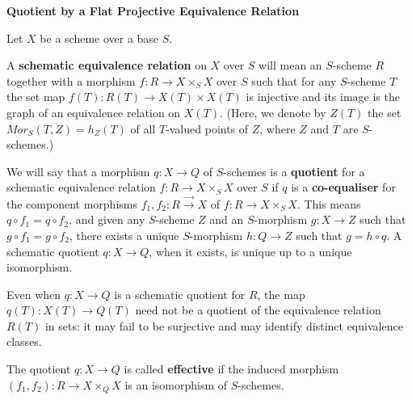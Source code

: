 \centerline{\large\bf Quotient by a Flat Projective Equivalence Relation}



\medskip


Let $X$ be a scheme over a base $S$.
\begin{definition}\label{nhq-schematic-equivalence-relation}
A \textbf{schematic equivalence relation} on $X$ over $S$ will
mean an $S$-scheme $R$ together with a morphism
$f: R \to X\times_SX$ over $S$ such that for any $S$-scheme
$T$ the set map $f(T) : R(T) \to X(T)\times X(T)$
is injective and its image is the graph of an equivalence relation on
$X(T)$. (Here, we denote by $Z(T)$ the set $Mor_S(T,Z)= h_Z(T)$ of
all $T$-valued points of $Z$, where $Z$ and $T$ are $S$-schemes.)
\end{definition}


\begin{definition}\label{nhq-schematic-quotient}
We will say that a morphism $q : X\to Q$ of $S$-schemes
is a \textbf{quotient} for a
schematic equivalence relation $f: R \to X\times_SX$ over $S$ if $q$
is a \textbf{co-equaliser} for the component morphisms
$f_1,f_2 : R  \stackrel{\to}{\scriptstyle\to} X$ of
$f: R \to X\times_SX$. This means $q \circ f_1 = q\circ f_2$,
and given any $S$-scheme $Z$ and an $S$-morphism $g : X \to Z$ such that
$g\circ f_1 = g\circ f_2$, there exists a unique $S$-morphism
$h : Q \to Z$ such that $g = h\circ q$.
A schematic quotient $q: X\to Q$, when it exists, is
unique up to a unique isomorphism.
\end{definition}

\begin{claim}\label{nhq-quotient-functor-points-caution}
Even when $q:X\to Q$ is a schematic quotient for $R$, the map
$q(T):X(T)\to Q(T)$ need not be a quotient of the equivalence relation
$R(T)$ in sets: it may fail to be surjective and may identify distinct
equivalence classes.
\end{claim}

\begin{definition}\label{nhq-effective-schematic-quotient}
The quotient $q:X\to Q$ is called \textbf{effective} if the induced
morphism $(f_1,f_2):R\to X\times_QX$ is an isomorphism of $S$-schemes.
\end{definition}

